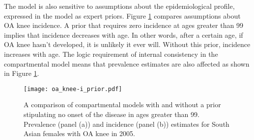 The model is also sensitive to assumptions about the epidemiological
profile, expressed in the model as expert priors.  Figure
\ref{fig:app-oa knee priors} compares assumptions about OA knee
incidence.  A prior that requires zero incidence at ages greater than
99 implies that incidence decreases with age.  In other words, after a
certain age, if OA knee hasn't developed, it is unlikely it ever
will. Without this prior, incidence increases with age.  The logic
requirement of internal consistency in the compartmental model means
that prevalence estimates are also affected as shown in Figure
\ref{fig:app-oa knee priors}.

    \begin{figure}[h]
        \begin{center}
            \texttt{[image: oa\_knee-i\_prior.pdf]}
            \caption{A comparison of compartmental models with and
              without a prior stipulating no onset of the disease in
              ages greater than 99.  Prevalence (panel (a)) and
              incidence (panel (b)) estimates for South Asian females
              with OA knee in 2005.}
            \label{fig:app-oa knee priors}
        \end{center}
    \end{figure}
